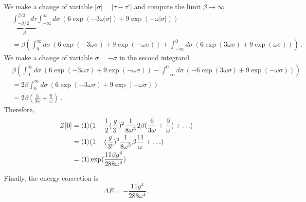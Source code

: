     We make a change of variable $|\sigma| = |\tau - \tau'|$ and compute the limit $\beta \rightarrow \infty$
    \begin{equation*}
    \begin{aligned}
        & \underbrace{\int_{- \beta / 2}^{\beta/2} d\tau}_\beta \int_{-\infty}^{\infty} d\sigma ~ (6 \exp(- 3 \omega |\sigma|) + 9 \exp(- \omega |\sigma|)) \\ & = \beta (\int_{0}^{\infty} d\sigma ~ (6 \exp(- 3 \omega \sigma) + 9 \exp(- \omega \sigma))  + \int_{-\infty}^{0} d\sigma ~ (6 \exp(3 \omega \sigma) + 9 \exp(\omega \sigma)))  ~.
    \end{aligned}
    \end{equation*}
    We make a change of variable $\sigma = - \sigma$ in the second integrand 
    \begin{equation*}
    \begin{aligned}
        & \beta (\int_{0}^{\infty} d\sigma ~ (6 \exp(- 3 \omega \sigma) + 9 \exp(- \omega \sigma)) - \int_{-\infty}^{0} d\sigma ~ ( -6 \exp(3 \omega \sigma) + 9 \exp(- \omega \sigma))) \\ & = 2 \beta \int_{0}^{\infty} d\sigma ~ (6 \exp(- 3 \omega \sigma) + 9 \exp(- \omega \sigma)) \\ & = 2 \beta (\frac{6}{3 \omega} + \frac{9}{\omega}) ~.
    \end{aligned}
    \end{equation*}
    Therefore,
    \begin{equation*}
    \begin{aligned}
        Z[0] & = \langle1\rangle ( 1 + \frac{1}{2} (\frac{g}{3!})^2 \frac{1}{8 \omega^3}2 \beta (\frac{6}{3 \omega} + \frac{9}{\omega}) + \ldots) \\ & = \langle1\rangle ( 1 +  (\frac{g}{3!})^2 \frac{1}{8 \omega^3} \beta \frac{11}{\omega}  + \ldots) \\ & = \langle1\rangle \exp(\frac{11 \beta g^4}{288 \omega^4} )~.
    \end{aligned}
    \end{equation*}

    Finally, the energy correction is 
    \begin{equation*}
        \Delta E = - \frac{11 g^4}{288 \omega^4} ~.
    \end{equation*}


